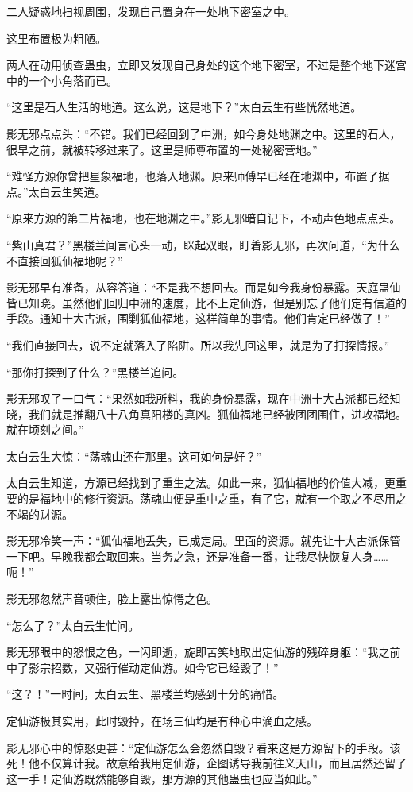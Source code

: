\begin{this_body}
二人疑惑地扫视周围，发现自己置身在一处地下密室之中。

这里布置极为粗陋。

两人在动用侦查蛊虫，立即又发现自己身处的这个地下密室，不过是整个地下迷宫中的一个小角落而已。

“这里是石人生活的地道。这么说，这是地下？”太白云生有些恍然地道。

影无邪点点头：“不错。我们已经回到了中洲，如今身处地渊之中。这里的石人，很早之前，就被转移过来了。这里是师尊布置的一处秘密营地。”

“难怪方源你曾把星象福地，也落入地渊。原来师傅早已经在地渊中，布置了据点。”太白云生笑道。

“原来方源的第二片福地，也在地渊之中。”影无邪暗自记下，不动声色地点点头。

“紫山真君？”黑楼兰闻言心头一动，眯起双眼，盯着影无邪，再次问道，“为什么不直接回狐仙福地呢？”

影无邪早有准备，从容答道：“不是我不想回去。而是如今我身份暴露。天庭蛊仙皆已知晓。虽然他们回归中洲的速度，比不上定仙游，但是别忘了他们定有信道的手段。通知十大古派，围剿狐仙福地，这样简单的事情。他们肯定已经做了！”

“我们直接回去，说不定就落入了陷阱。所以我先回这里，就是为了打探情报。”

“那你打探到了什么？”黑楼兰追问。

影无邪叹了一口气：“果然如我所料，我的身份暴露，现在中洲十大古派都已经知晓，我们就是推翻八十八角真阳楼的真凶。狐仙福地已经被团团围住，进攻福地。就在顷刻之间。”

太白云生大惊：“荡魂山还在那里。这可如何是好？”

太白云生知道，方源已经找到了重生之法。如此一来，狐仙福地的价值大减，更重要的是福地中的修行资源。荡魂山便是重中之重，有了它，就有一个取之不尽用之不竭的财源。

影无邪冷笑一声：“狐仙福地丢失，已成定局。里面的资源。就先让十大古派保管一下吧。早晚我都会取回来。当务之急，还是准备一番，让我尽快恢复人身……呃！”

影无邪忽然声音顿住，脸上露出惊愕之色。

“怎么了？”太白云生忙问。

影无邪眼中的怒恨之色，一闪即逝，旋即苦笑地取出定仙游的残碎身躯：“我之前中了影宗招数，又强行催动定仙游。如今它已经毁了！”

“这？！”一时间，太白云生、黑楼兰均感到十分的痛惜。

定仙游极其实用，此时毁掉，在场三仙均是有种心中滴血之感。

影无邪心中的惊怒更甚：“定仙游怎么会忽然自毁？看来这是方源留下的手段。该死！他不仅算计我。故意给我用定仙游，企图诱导我前往义天山，而且居然还留了这一手！定仙游既然能够自毁，那方源的其他蛊虫也应当如此。”


\end{this_body}

